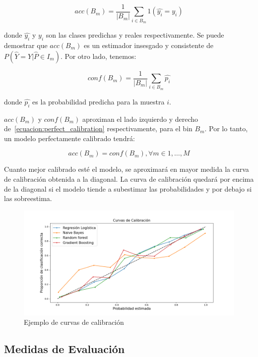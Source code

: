\begin{equation}\label{ecuacion:acc_bm}
    acc(B_m)=\frac{1}{|B_m|}\sum _{i \in B_m}1(\hat{y_i}=y_i)
\end{equation}

donde $\hat{y_i}$ y $y_i$ son las clases predichas y reales respectivamente. Se
puede demostrar que $acc(B_m)$ es un estimador insesgado y consistente de
$P(\hat{Y}=Y|\hat{P}\in I_m)$. Por otro lado, tenemos:

\begin{equation}\label{ecuacion:conf_bm}
    conf(B_m)=\frac{1}{|B_m|}\sum _{i \in B_m}\hat{p_i}
\end{equation}

donde $\hat{p_i}$ es la probabilidad predicha para la muestra $i$.

    $acc(B_m)$ y $conf(B_m)$ aproximan el lado izquierdo y derecho
de~\ref{ecuacion:perfect_calibration} respectivamente, para el bin $B_m$. Por lo
tanto, un modelo perfectamente calibrado tendrá:

\begin{equation}\label{ecuacion:acc_conf_bm}
    acc(B_m)=conf(B_m), \forall m \in {1,\dots,M}
\end{equation}

Cuanto mejor calibrado esté el modelo, se aproximará en mayor medida la curva de
calibración obtenida a la diagonal. La curva de calibración quedará por encima
de la diagonal si el modelo tiende a subestimar las probabilidades y por debajo
si las sobreestima.

\begin{figure}[H]
    \centerline{\includegraphics[width=\textwidth]{../plots_teoria/curvas_de_calibracion.png}}
    \caption{Ejemplo de curvas de calibración}\label{fig:curvas_de_calibracion}
\end{figure}

\subsection{Medidas de Evaluación}

